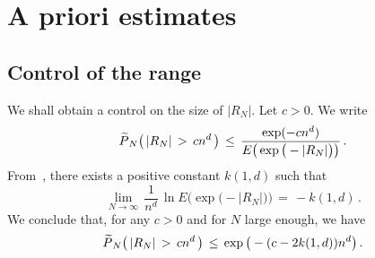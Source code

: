 \documentclass[AHL, Unicode, longabstracts, published]{cedram}
\newcommand*\wP{\smash{\widetilde P}}
\begin{document}
\section{A priori estimates}\label{S:apriori}


\subsection{Control of the range}\label{conran}
We shall obtain a control on the size of $|R_N|$. Let $c>0$. We write
\[
\wP_N\big(\,|R_N|\,>\,cn^d\,\big)\,\leq\,
\frac{\exp(-cn^d)}{ E\big(
\exp\big(-|R_N|\big)\big)}\,.
\]
From~\cite[Theorem~$1$]{DVRA}, there exists a positive constant $k(1,d)$ such that
\[
\lim_{N\to\infty}\,\frac{1}{n^d}\,\ln
E\big(
\exp\big(-|R_N|\big)\big)\,=\,-k(1,d)\,.
\]
We conclude that, for any $c>0$ and for $N$ large enough, we have
\begin{equation}\label{range}
\wP_N\big(\,|R_N|\,>\,cn^d\,\big)\,\leq\,
\exp\big(-(c-2k(1,d))n^d\big)\,.
\end{equation}
\end{document}
